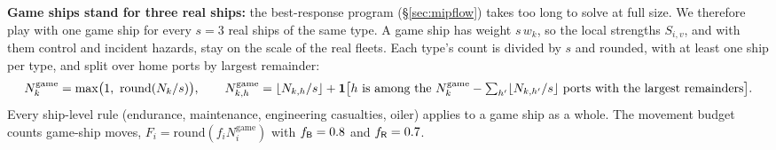 \begin{addblock}
\textbf{Game ships stand for three real ships:}\label{sec:hullscale} the best-response program (\S\ref{sec:mipflow}) takes too
long to solve at full size. We therefore play with one game ship for every
$s=3$ real ships of the same type. A game ship has weight $s\,w_k$, so the local strengths $S_{i,v}$, and with them control and
incident hazards, stay on the scale of the real fleets. Each type's count is divided by $s$ and rounded, with at least one ship
per type, and split over home ports by largest remainder:
\[
N^{\text{game}}_k=\max\!\big(1,\ \mathrm{round}(N_k/s)\big),\qquad
N^{\text{game}}_{k,h}=\lfloor N_{k,h}/s\rfloor+\1\big[h\text{ is among the }N^{\text{game}}_k-\textstyle\sum_{h'}\lfloor N_{k,h'}/s\rfloor\text{ ports with the largest remainders}\big].
\]
Every ship-level rule (endurance, maintenance, engineering casualties, oiler) applies to a game ship as a whole. The
movement budget counts game-ship moves, $F_i=\mathrm{round}(f_i N^{\text{game}}_i)$ with $f_{\mathsf{B}}=0.8$ and $f_{\mathsf{R}}=0.7$.
\end{addblock}
